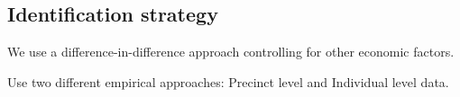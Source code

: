 \documentclass[12pt,a4paper]{article}
\begin{document}



\subsection{Identification strategy}


We use a difference-in-difference approach controlling for other economic factors. 

Use two different empirical approaches: Precinct level and Individual level data.

\end{document}
